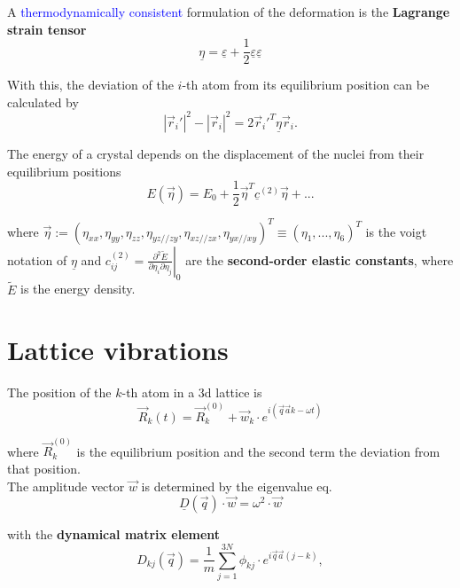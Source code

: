 \documentclass{article}
\begin{document}
A \textcolor{blue}{thermodynamically consistent} formulation of the deformation is the \textbf{Lagrange strain tensor}
	\begin{equation}
		\underline{\eta} = \underline{\varepsilon} + \frac{1}{2}\underline{\varepsilon}\underline{\varepsilon}
	\end{equation}

With this, the deviation of the $i$-th atom from its equilibrium position can be calculated by
	\begin{equation}
		|\vec{r}_i'|^2 - |\vec{r}_i|^2 = 2 \vec{r}_i'^T \underline{\eta} \vec{r}_i.
	\end{equation}

The energy of a crystal depends on the displacement of the nuclei from their equilibrium positions
	\begin{equation}
		E(\vec{\eta}) = E_0 + \frac{1}{2} \vec{\eta}^T \underline{c}^{(2)} \vec{\eta} + ...
	\end{equation}

where $\vec{\eta} := ( \eta_{xx}, \eta_{yy}, \eta_{zz}, \eta_{yz//zy}, \eta_{xz//zx}, \eta_{yx//xy} )^T \equiv (\eta_1, ..., \eta_6 )^T$ is the voigt notation of $\underline{\eta}$ and $c_{ij}^{(2)} = \left. \frac{\partial^2 \tilde{E}}{\partial \eta_i \partial \eta_j} \right|_0$ are the \textbf{second-order elastic constants}, where $\tilde{E}$ is the energy density.


\newpage


\section{Lattice vibrations}
The position of the $k$-th atom in a 3d lattice is
	\begin{equation}
		\vec{R}_k(t) = \vec{R}_k^{(0)} + \vec{w}_k \cdot e^{i(\vec{q}\vec{a}k - \omega t)}
	\end{equation}

where $\vec{R}_k^{(0)}$ is the equilibrium position and the second term the deviation from that position.\\
The amplitude vector $\vec{w}$ is determined by the eigenvalue eq.
	\begin{equation}
		\label{eigenvalue d matrix}
		\underline{D}(\vec{q}) \cdot \vec{w} = \omega^2 \cdot \vec{w}
	\end{equation}

with the \textbf{dynamical matrix element}
	\begin{equation}
		D_{kj}(\vec{q}) = \frac{1}{m} \sum_{j=1}^{3N} \phi_{kj} \cdot e^{i\vec{q}\vec{a}(j-k)},
	\end{equation}
	
\end{document}
